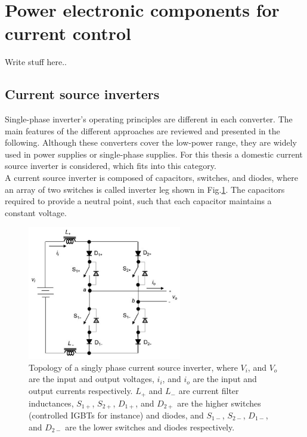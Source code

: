 \section{Power electronic components for current control}

Write stuff here..

\subsection{Current source inverters}\label{BASICCSR:sec:CSI}

Single-phase inverter's operating principles are different in each converter. The main features of the different approaches are reviewed and presented in the following. Although these converters cover the low-power range, they are widely used in power supplies or single-phase supplies. For this thesis a domestic current source inverter is considered, which fits into this category.\\
A current source inverter is composed of capacitors, switches, and diodes, where an array of two switches is called inverter leg shown in Fig.\ref{BASICCSR:fig:SingleCSI}. The capacitors required to provide a neutral point, such that each capacitor maintains a constant voltage.

\begin{figure}[!ht]
        \centering
        \includegraphics[width=0.6\textwidth]{EMPC_PNG_Pics/CurrentSourceInverter.png}
        \caption{Topology of a singly phase current source inverter, where $V_i$, and $V_o$ are the input and output voltages, $i_i$, and $i_o$ are the input and output currents respectively. $L_+$ and $L_-$ are current filter inductances, $S_{1+}$, $S_{2+}$, $D_{1+}$, and $D_{2+}$ are the higher switches (controlled IGBTs for instance) and diodes, and $S_{1-}$, $S_{2-}$, $D_{1-}$, and $D_{2-}$ are the lower switches and diodes respectively.}
        \label{BASICCSR:fig:SingleCSI}
    \end{figure}

